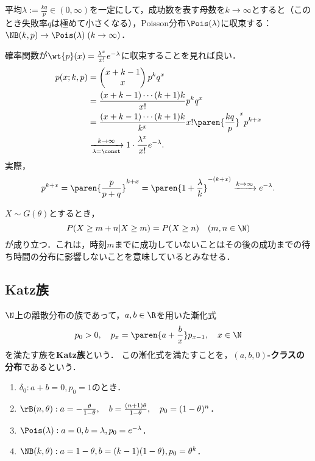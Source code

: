 \documentclass[uplatex,dvipdfmx]{jsreport}
\begin{document}
\begin{proposition}[Poisson近似]
    平均$\lambda:=\frac{kq}{p}\in(0,\infty)$を一定にして，成功数を表す母数を$k\to\infty$とすると（このとき失敗率$q$は極めて小さくなる），Poisson分布$\Pois(\lambda)$に収束する：$\NB(k,p)\to\Pois(\lambda)\;(k\to\infty)$．
\end{proposition}
\begin{Proof}
    確率関数が$\wt{p}(x)=\frac{\lambda^x}{x!}e^{-\lambda}$に収束することを見れば良い．
    \begin{align*}
        p(x;k,p)&=\begin{pmatrix}x+k-1\\x\end{pmatrix}p^kq^x\\
        &=\frac{(x+k-1)\cdots(k+1)k}{x!}p^kq^x\\
        &=\frac{(x+k-1)\cdots(k+1)k}{k^x}x!\paren{\frac{kq}{p}}^xp^{k+x}\\
        &\xrightarrow[\lambda=\const]{k\to\infty}1\cdot\frac{\lambda^x}{x!}e^{-\lambda}.
    \end{align*}
    実際，
    \[p^{k+x}=\paren{\frac{p}{p+q}}^{k+x}=\paren{1+\frac{\lambda}{k}}^{-(k+x)}\xrightarrow{k\to\infty}e^{-\lambda}.\]
\end{Proof}

\begin{remark}[幾何分布の無記憶性]
    $X\sim G(\theta)$とするとき，
    \[P(X\ge m+n|X\ge m)=P(X\ge n)\quad(m,n\in\N)\]
    が成り立つ．これは，時刻$m$までに成功していないことはその後の成功までの待ち時間の分布に影響しないことを意味しているとみなせる．
\end{remark}

\subsection{Katz族}

\begin{definition}
    $\N$上の離散分布の族であって，$a,b\in\R$を用いた漸化式
    \[p_0>0,\quad p_x=\paren{a+\frac{b}{x}}p_{x-1},\quad x\in\N\]
    を満たす族を\textbf{Katz族}という．
    この漸化式を満たすことを，\textbf{$(a,b,0)$-クラスの分布}であるという．
\end{definition}
\begin{example}\mbox{}
    \begin{enumerate}
        \item $\delta_0:a+b=0,p_0=1$のとき．
        \item $\rB(n,\theta):a=-\frac{\theta}{1-\theta},\quad b=\frac{(n+1)\theta}{1-\theta},\quad p_0=(1-\theta)^n$．
        \item $\Pois(\lambda):a=0,b=\lambda,p_0=e^{-\lambda}$．
        \item $\NB(k,\theta):a=1-\theta,b=(k-1)(1-\theta),p_0=\theta^k$．
    \end{enumerate}
\end{example}
\end{document}

